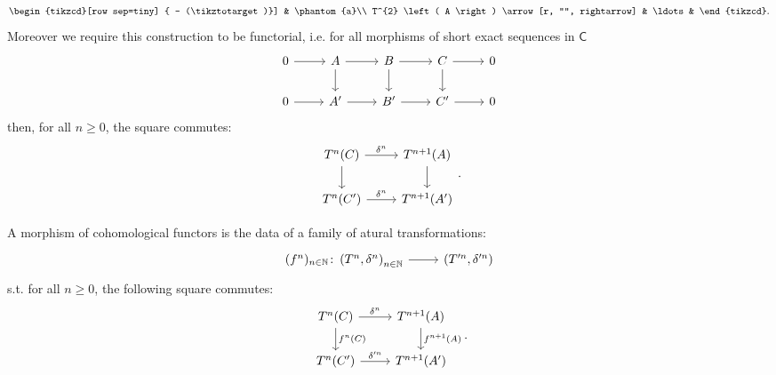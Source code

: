 \documentclass[../Main]{subfiles}
\begin{document}
\begin{defn}
\begin{enumerate}
\begin{equation}
\begin{tikzcd}[row sep=tiny]
{				-- (\tikztotarget)}] & 
			\phantom{a}\\
			T^{2} \left( A \right) \arrow[r, "", rightarrow] &
			\ldots &
		\end{tikzcd}
		.\end{equation}
			Moreover we require this construction to be functorial, i.e. for all
			morphisms of short exact sequences in $\mathsf{C}$
			\begin{equation}
			\begin{tikzcd}
				0 \arrow[r, "", rightarrow] &
				A \arrow[r, "", rightarrow] 
				\arrow[d, "", rightarrow] &
				B \arrow[r, "", rightarrow] 
				\arrow[d, "", rightarrow] &
				C \arrow[r, "", rightarrow] 
			  \arrow[d, "", rightarrow] &
				0\\
				0 \arrow[r, "", rightarrow] &
				A' \arrow[r, "", rightarrow] &
				B' \arrow[r, "", rightarrow] &
				C' \arrow[r, "", rightarrow] &
				0
			\end{tikzcd}
			\end{equation} 
			then, for all $n \geq 0$, the square commutes:
			\begin{equation}
			\begin{tikzcd}
				T^n(C) \arrow[r, "\delta^n", rightarrow] 
				\arrow[d, "", rightarrow] &
				T^{n+1}(A) \arrow[d, "", rightarrow] \\
				T^n(C') \arrow[r, "\delta^n", rightarrow] &
				T^{n+1}(A')
			\end{tikzcd}
			.\end{equation} 
	\end{enumerate}
\end{defn}
\begin{defn}
	A morphism of cohomological functors is the data of
	a family of atural transformations:
	\begin{equation}
	\begin{tikzcd}
		(f^n)_{n \in \mathbb{N}}\colon
		\left(T^n, \delta^n\right)_{n \in \mathbb{N}} \arrow[r, "", rightarrow] &
		\left(T'^n, \delta'^n\right)
	\end{tikzcd}
	\end{equation} 
	s.t. for all $n \geq 0$, the following square commutes:
			\begin{equation}
			\begin{tikzcd}
				T^n(C) \arrow[r, "\delta^n", rightarrow] 
				\arrow[d, "f^n(C)", rightarrow] &
				T^{n+1}(A) \arrow[d, "f^{n+1}(A)", rightarrow] \\
				T^n(C') \arrow[r, "\delta'^n", rightarrow] &
				T^{n+1}(A')
			\end{tikzcd}
			.\end{equation} 
\end{defn}
\end{document}

